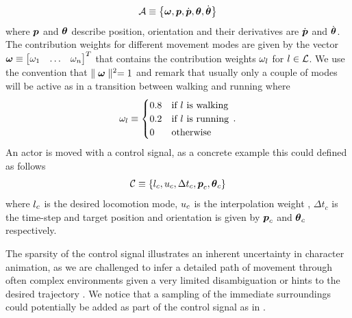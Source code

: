 \begin{equation}
    \label{eq:actor:def}
    \mathcal{A} 
    \equiv
    \left\{ 
        \boldsymbol{\omega }, \boldsymbol{p }, \dot{\boldsymbol{p }}, \boldsymbol{\theta } ,\dot{\boldsymbol{\theta }} 
         \right\}
\end{equation}
where $\boldsymbol{p }$ and $\boldsymbol{\theta }$ describe position, orientation and their derivatives are $\dot{\boldsymbol{p }}$ and $\dot{\boldsymbol{\theta }}$.  The contribution weights for different movement modes are given by the vector $\boldsymbol{\omega } \equiv \begin{bmatrix}\omega_1 & \ldots & \omega_n \end{bmatrix}^T$ that contains the contribution weights $\omega_l$ for $l \in \mathcal{L}$. We use the convention that $\parallel {  \boldsymbol{\omega }  } \parallel^2 = 1$ and remark that usually only a couple of modes will be active as in a transition between walking and running where 
\begin{equation}
    \label{eq:contribusion:weight:example}
    \omega_l \equiv
    \begin{cases}
    0.8 & \text{if $l$ is walking} \\
    0.2 & \text{if $l$ is running} \\
    0 & \text{otherwise}
    \end{cases}\,.
\end{equation}
An actor is moved with a control signal, as a concrete example this could defined as follows
\begin{equation}
    \label{eq:control:signal:def}
    \mathcal{C} \equiv \left\{ 
    l_c, u_c, \Delta{t}_c, \boldsymbol{p }_c, \boldsymbol{\theta }_c \right\}
\end{equation}
where $l_c$ is the desired locomotion mode, $u_c$ is the interpolation weight  , $\Delta t_c$ is the time-step   and target position and orientation is given by $\boldsymbol{p }_c$ and $\boldsymbol{\theta }_c$ respectively.

The sparsity of the control signal illustrates an inherent uncertainty in character animation, as we are challenged to infer a detailed path of movement through often complex environments given a very limited disambiguation or hints to the desired trajectory \cite{holden.ea16}. We notice that a sampling of the immediate surroundings could potentially be added as part of the control signal as in \cite{holden.ea17}. 

